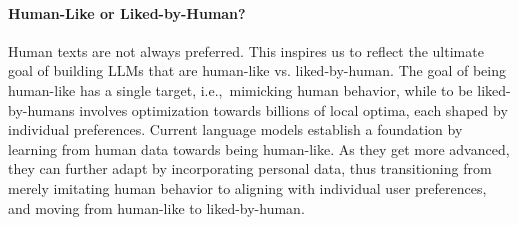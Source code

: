 \paragraph{Human-Like or Liked-by-Human?}
Human texts are not always preferred. This inspires us to reflect the ultimate goal of building LLMs that are human-like vs. liked-by-human.
The goal of being human-like has a single target, i.e.,~mimicking human behavior, while to be liked-by-humans involves optimization towards billions of local optima, each shaped by individual preferences.  
Current language models establish a foundation by learning from human data towards being human-like. 
As they get more advanced, they can further adapt by incorporating personal data, thus transitioning from merely imitating human behavior to aligning with individual user preferences, and moving from human-like to liked-by-human.